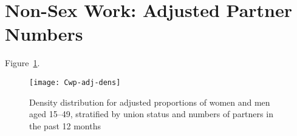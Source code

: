 \section{Non-Sex Work: Adjusted Partner Numbers}\label{app.model.nsw}
Figure~\ref{fig:Cwp.adj.dens}.
\begin{figure}[h]
  \centering
  \texttt{[image: Cwp-adj-dens]}
  \caption{Density distribution for adjusted proportions of women and men aged 15--49,
    stratified by union status and numbers of partners in the past 12 months}
  \label{fig:Cwp.adj.dens}
\end{figure}